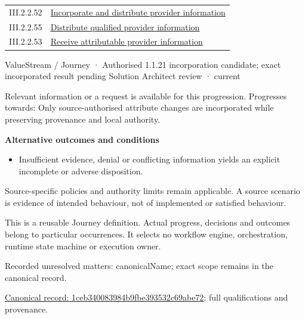 \begin{longtable}{p{.22\linewidth}p{.73\linewidth}}
III.2.2.52 & \hyperref[element:9eb9f3210d5e4b46ac21463f54e62ab9]{Incorporate and distribute provider information} \\
III.2.2.55 & \hyperref[element:cfa9cb430ecd464dae89c710c4a040b5]{Distribute qualified provider information} \\
III.2.2.53 & \hyperref[element:db6083a887c24c55a32715f0c331c5d2]{Receive attributable provider information} \\
\end{longtable}
\label{element:1ceb340083984b9fbe393532c69abe72}
{\small ValueStream / Journey · Authorised 1.1.21 incorporation candidate; exact incorporated result pending Solution Architect review · current}\par

Relevant information or a request is available for this progression. Progresses towards: Only source-authorised attribute changes are incorporated while preserving provenance and local authority.



\par\medskip\textbf{Alternative outcomes and conditions}\par


\begin{itemize}


\item Insufficient evidence, denial or conflicting information yields an explicit incomplete or adverse disposition.

\end{itemize}


Source-specific policies and authority limits remain applicable. A source scenario is evidence of intended behaviour, not of implemented or satisfied behaviour.



This is a reusable Journey definition. Actual progress, decisions and outcomes belong to particular occurrences. It selects no workflow engine, orchestration, runtime state machine or execution owner.


{\small Recorded unresolved matters: canonicalName; exact scope remains in the canonical record.}\par
{\footnotesize \href{../../../../continuum/strategy/value-stream/1ceb340083984b9fbe393532c69abe72.md}{Canonical record: 1ceb340083984b9fbe393532c69abe72}; full qualifications and provenance.}\par
